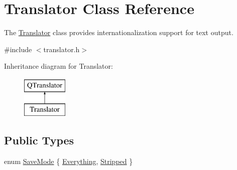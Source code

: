 \hypertarget{classTranslator}{}\section{Translator Class Reference}
\label{classTranslator}


The \hyperlink{classTranslator}{Translator} class provides internationalization support for text output.  




{\ttfamily \#include $<$translator.\+h$>$}

Inheritance diagram for Translator\+:\begin{figure}[H]
\begin{center}
\leavevmode
\includegraphics[height=2.000000cm]{classTranslator}
\end{center}
\end{figure}
\subsection*{Public Types}
\begin{DoxyCompactItemize}
\item 
enum \hyperlink{classTranslator_aefe656fdfa14952a99d6d25e61749a99}{Save\+Mode} \{ \hyperlink{classTranslator_aefe656fdfa14952a99d6d25e61749a99a3847cfbd6836d9a65ac73fc641bb3085}{Everything}, 
\hyperlink{classTranslator_aefe656fdfa14952a99d6d25e61749a99a68d586d3f7ea596c2a5d1252fad326d6}{Stripped}
 \}
\end{DoxyCompactItemize}
